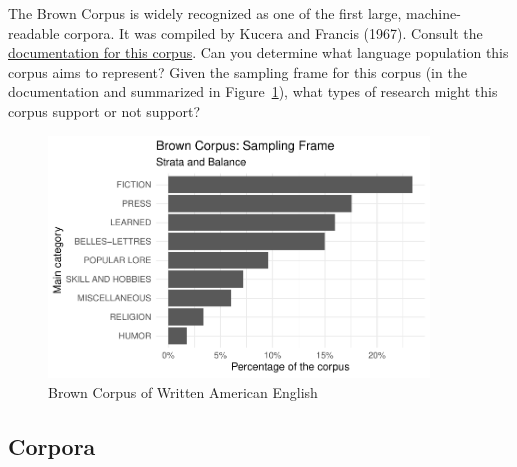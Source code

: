 \documentclass[
  letterpaper,
]{latex/krantz}
\begin{document}
\begin{tcolorbox}[enhanced jigsaw, toprule=.15mm, bottomtitle=1mm, coltitle=black, title=\textcolor{quarto-callout-important-color}{\faExclamation}\hspace{0.5em}{Consider}, left=2mm, colframe=quarto-callout-important-color-frame, bottomrule=.15mm, colbacktitle=quarto-callout-important-color!10!white, leftrule=.75mm, colback=white, titlerule=0mm, breakable, toptitle=1mm, opacityback=0, arc=.35mm, rightrule=.15mm, opacitybacktitle=0.6]

The Brown Corpus is widely recognized as one of the first large,
machine-readable corpora. It was compiled by Kucera and Francis (1967).
Consult the
\href{http://korpus.uib.no/icame/brown/bcm.html}{documentation for this
corpus}. Can you determine what language population this corpus aims to
represent? Given the sampling frame for this corpus (in the
documentation and summarized in Figure~\ref{fig-brown-distribution}),
what types of research might this corpus support or not support?

\end{tcolorbox}

\begin{figure}[h]

{\centering \includegraphics[width=0.9\textwidth,height=\textheight]{./understanding-data_files/figure-pdf/fig-brown-distribution-1.pdf}

}

\caption{\label{fig-brown-distribution}Brown Corpus of Written American
English}

\end{figure}

\hypertarget{corpora}{%
\subsection{Corpora}\label{corpora}}
\end{document}
